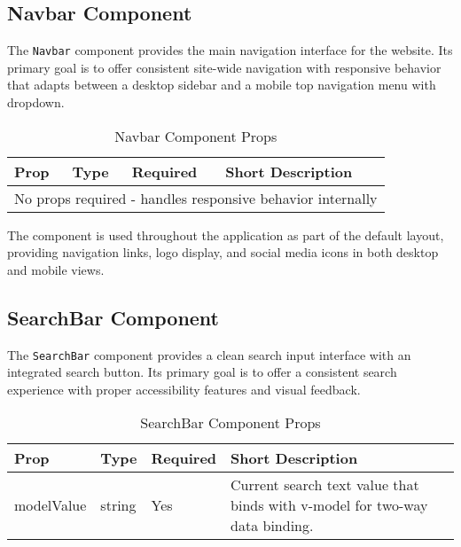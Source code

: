 \subsection{Navbar Component}
The \texttt{Navbar} component provides the main navigation interface for the website. Its primary goal is to offer consistent site-wide navigation with responsive behavior that adapts between a desktop sidebar and a mobile top navigation menu with dropdown.

\begin{table}[H]
    \centering
    \setlength{\tabcolsep}{5pt}
    \renewcommand{\arraystretch}{1.2}
    \begin{tabular}{|p{2.2cm}|p{3.6cm}|p{1.5cm}|p{6cm}|}
        \hline
        \rowcolor{bluepoli!20}
        \textbf{Prop} & \textbf{Type} & \textbf{Required} & \textbf{Short Description} \\
        \hline
        \multicolumn{4}{|c|}{No props required - handles responsive behavior internally} \\
        \hline
    \end{tabular}
    \caption{Navbar Component Props}
\end{table}

The component is used throughout the application as part of the default layout, providing navigation links, logo display, and social media icons in both desktop and mobile views.

\subsection{SearchBar Component}
The \texttt{SearchBar} component provides a clean search input interface with an integrated search button. Its primary goal is to offer a consistent search experience with proper accessibility features and visual feedback.

\begin{table}[H]
    \centering
    \setlength{\tabcolsep}{5pt}
    \renewcommand{\arraystretch}{1.2}
    \begin{tabular}{|p{2.2cm}|p{3.6cm}|p{1.5cm}|p{6cm}|}
        \hline
        \rowcolor{bluepoli!20}
        \textbf{Prop} & \textbf{Type} & \textbf{Required} & \textbf{Short Description} \\
        \hline
        modelValue & string & Yes & Current search text value that binds with v-model for two-way data binding. \\
        \hline
    \end{tabular}
    \caption{SearchBar Component Props}
\end{table}

